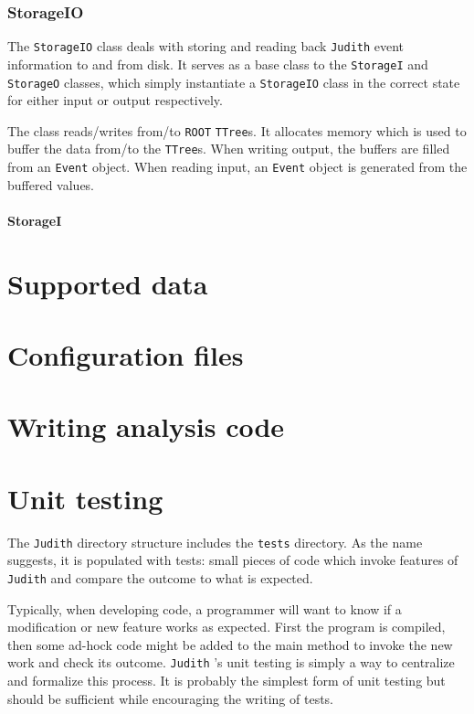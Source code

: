 \documentclass[10pt,a4paper]{book}
\newcommand{\ROOT}{\Verb`ROOT` }
\newcommand{\Judith}{\Verb`Judith` }
\begin{document}
\subsection{StorageIO}

The \Verb`StorageIO` class deals with storing and reading back \Judith event information to and from disk. It serves as a base class to the \Verb`StorageI` and \Verb`StorageO` classes, which simply instantiate a \Verb`StorageIO` class in the correct state for either input or output respectively.

The class reads/writes from/to \ROOT \Verb`TTree`s. It allocates memory which is used to buffer the data from/to the \Verb`TTree`s. When writing output, the buffers are filled from an \Verb`Event` object. When reading input, an \Verb`Event` object is generated from the buffered values.

\subsubsection{StorageI}

\chapter{Supported data}

\chapter{Configuration files}

\chapter{Writing analysis code}

\chapter{Unit testing}
\label{ch:unittesting}

The \Judith directory structure includes the \Verb`tests` directory. As the name suggests, it is populated with tests: small pieces of code which invoke features of \Judith and compare the outcome to what is expected.

Typically, when developing code, a programmer will want to know if a modification or new feature works as expected. First the program is compiled, then some ad-hock code might be added to the main method to invoke the new work and check its outcome. \Judith's unit testing is simply a way to centralize and formalize this process. It is probably the simplest form of unit testing but should be sufficient while encouraging the writing of tests.
\end{document}
